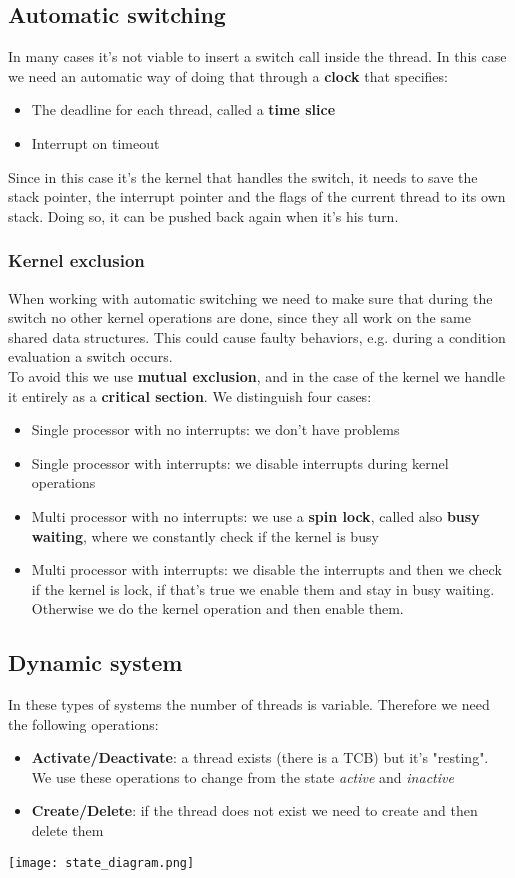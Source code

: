 \subsection{Automatic switching}
In many cases it's not viable to insert a switch call inside the thread. In this case we need an automatic way of doing that through a \textbf{clock} that specifies:
\begin{itemize}
	\item The deadline for each thread, called a \textbf{time slice}
	\item Interrupt on timeout
\end{itemize}
Since in this case it's the kernel that handles the switch, it needs to save the stack pointer, the interrupt pointer and the flags of the current thread to its own stack. Doing so, it can be pushed back again when it's his turn.

\subsubsection{Kernel exclusion}
When working with automatic switching we need to make sure that during the switch no other kernel operations are done, since they all work on the same shared data structures. This could cause faulty behaviors, e.g. during a condition evaluation a switch occurs.\\
To avoid this we use \textbf{mutual exclusion}, and in the case of the kernel we handle it entirely as a \textbf{critical section}. We distinguish four cases:
\begin{itemize}
	\item Single processor with no interrupts: we don't have problems
	\item Single processor with interrupts: we disable interrupts during kernel operations
	\item Multi processor with no interrupts: we use a \textbf{spin lock}, called also \textbf{busy waiting}, where we constantly check if the kernel is busy
	\item Multi processor with interrupts: we disable the interrupts and then we check if the kernel is lock, if that's true we enable them and stay in busy waiting. Otherwise we do the kernel operation and then enable them.
\end{itemize}

\subsection{Dynamic system}
In these types of systems the number of threads is variable. Therefore we need the following operations:
\begin{itemize}
	\item \textbf{Activate/Deactivate}: a thread exists (there is a TCB) but it's "resting". We use these operations to change from the state \textit{active} and \textit{inactive}
	\item \textbf{Create/Delete}: if the thread does not exist we need to create and then delete them
\end{itemize}
\begin{center}
	\texttt{[image: state\_diagram.png]}
\end{center}

